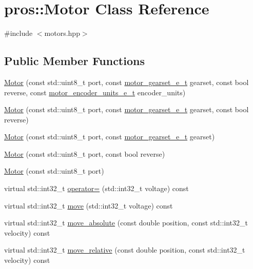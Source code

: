 \hypertarget{classpros_1_1Motor}{}\section{pros\+:\+:Motor Class Reference}
\label{classpros_1_1Motor}


{\ttfamily \#include $<$motors.\+hpp$>$}

\subsection*{Public Member Functions}
\begin{DoxyCompactItemize}
\item 
\hyperlink{classpros_1_1Motor_a5be9a41f9877208c887d5e2c081bc72e}{Motor} (const std\+::uint8\+\_\+t port, const \hyperlink{motors_8h_aa2f1c305c998abc3bf8dd1f76fa4da8b}{motor\+\_\+gearset\+\_\+e\+\_\+t} gearset, const bool reverse, const \hyperlink{motors_8h_a6677ba23760c558fd8b7b4e1e00a6123}{motor\+\_\+encoder\+\_\+units\+\_\+e\+\_\+t} encoder\+\_\+units)
\item 
\hyperlink{classpros_1_1Motor_a512050b652bf3034a21da12bf2b663ac}{Motor} (const std\+::uint8\+\_\+t port, const \hyperlink{motors_8h_aa2f1c305c998abc3bf8dd1f76fa4da8b}{motor\+\_\+gearset\+\_\+e\+\_\+t} gearset, const bool reverse)
\item 
\hyperlink{classpros_1_1Motor_aff27ad42b72a59c35e36a665bcd763a6}{Motor} (const std\+::uint8\+\_\+t port, const \hyperlink{motors_8h_aa2f1c305c998abc3bf8dd1f76fa4da8b}{motor\+\_\+gearset\+\_\+e\+\_\+t} gearset)
\item 
\hyperlink{classpros_1_1Motor_a822e0023951996ca7eff13ffe9cf953d}{Motor} (const std\+::uint8\+\_\+t port, const bool reverse)
\item 
\hyperlink{classpros_1_1Motor_a767b4ad39251b8e8411fae17a35b24ba}{Motor} (const std\+::uint8\+\_\+t port)
\item 
virtual std\+::int32\+\_\+t \hyperlink{classpros_1_1Motor_a4cf8a9518eb6cd268d27151f0df7fd38}{operator=} (std\+::int32\+\_\+t voltage) const
\item 
virtual std\+::int32\+\_\+t \hyperlink{classpros_1_1Motor_a7ea9aedd4e12844be2584dc3f4b7a4bf}{move} (std\+::int32\+\_\+t voltage) const
\item 
virtual std\+::int32\+\_\+t \hyperlink{classpros_1_1Motor_a7851ffa40c9803d75398a5be355de395}{move\+\_\+absolute} (const double position, const std\+::int32\+\_\+t velocity) const
\item 
virtual std\+::int32\+\_\+t \hyperlink{classpros_1_1Motor_a96c09e169b5135d9001cec92fa2686c1}{move\+\_\+relative} (const double position, const std\+::int32\+\_\+t velocity) const

\end{DoxyCompactItemize}
